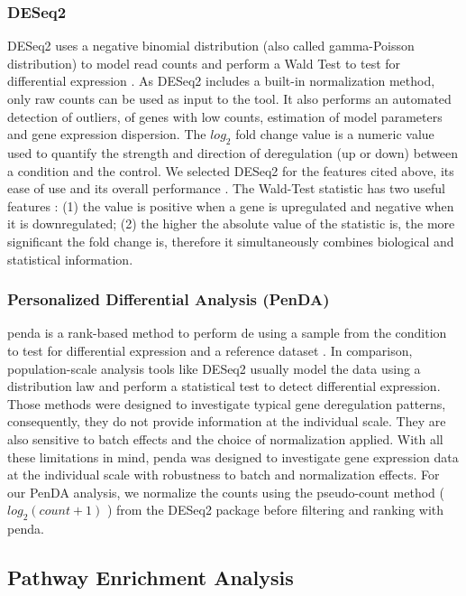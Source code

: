 \subsubsection{DESeq2}

DESeq2 uses a negative binomial distribution (also called gamma-Poisson distribution) to model read counts and perform a Wald Test to test for differential expression \cite*{Love2014}.
As DESeq2 includes a built-in normalization method, only raw counts can be used as input to the tool.
It also performs an automated detection of outliers, of genes with low counts, estimation of model parameters and gene expression dispersion.
The $log_2$ fold change value is a numeric value used to quantify the strength and direction of deregulation (up or down) between a condition and the control.
We selected DESeq2 for the features cited above, its ease of use and its overall performance \cite*{Love2014}.
The Wald-Test statistic has two useful features : (1) the value is positive when a gene is upregulated and negative when it is downregulated; (2) the higher the absolute value of the statistic is, the more significant the fold change is, therefore it simultaneously combines biological and statistical information.

\subsubsection{ Personalized Differential Analysis (PenDA)}

\acrshort{penda} is a rank-based method to perform \acrshort{de} using a sample from the condition to test for differential expression and a reference dataset \cite*{Richard2020}.
In comparison, population-scale analysis tools like DESeq2 usually model the data using a distribution law and perform a statistical test to detect differential expression.
Those methods were designed to investigate typical gene deregulation patterns, consequently, they do not provide information at the individual scale.
They are also sensitive to batch effects and the choice of normalization applied.
With all these limitations in mind, \acrshort{penda} was designed to investigate gene expression data at the individual scale with robustness to batch and normalization effects.
For our PenDA analysis, we normalize the counts using the pseudo-count method ( $log_2(count + 1)$ ) from the DESeq2 package before filtering and ranking with \acrshort{penda}.

\subsection{Pathway Enrichment Analysis}

